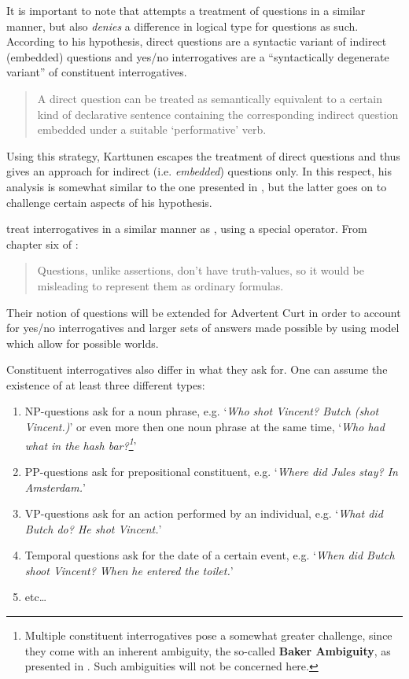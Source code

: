 \documentclass[a4paper]{article}
\newcommand{\term}[1]{\textsf{\textbf{#1}}} %
\newcommand{\pn}{\textsf} %
\newcommand{\example}[1]{`\textit{#1}'} %
\newenvironment{quotes}{\begin{quote}\sf}{\rm\end{quote}}
\newcommand{\acurt}{\pn{Advertent Curt}}
\theoremstyle{remark}
\theoremstyle{remark}
\theoremstyle{definition}
\theoremstyle{definition}
\begin{document}
It is important to note that \cite{karttunen:1977} attempts a treatment of
questions in a similar manner, but also \emph{denies} a difference in logical
type for questions as such. According to his hypothesis, direct questions are a
syntactic variant of indirect (embedded) questions and yes/no interrogatives are
a ``syntactically degenerate variant'' of constituent interrogatives.

\begin{quotes}A direct question can be treated as semantically equivalent to a
certain kind of declarative sentence containing the corresponding indirect
question embedded under  a suitable `performative' verb.\end{quotes}

Using this strategy, Karttunen escapes the treatment of direct  questions and
thus gives an approach for indirect (i.e. \emph{embedded}) questions  only.
In this respect, his analysis is somewhat similar to the one presented in
\cite{gs:sawhq}, but the latter goes on to challenge certain aspects of his
hypothesis.

\cite{blackburnbos:cl1} treat interrogatives in a similar manner as \cite{gs:q},
using a special operator. From chapter six of \cite{blackburnbos:cl1}:

\begin{quotes}
  Questions, unlike assertions, don't have truth-values, so it would be
  misleading to represent them as ordinary formulas.
\end{quotes}

Their notion of questions will be extended for \acurt{} in order to account for
yes/no interrogatives and larger sets of answers made possible by using model
which allow for possible worlds.

Constituent interrogatives also differ in what they ask for. One can assume the
existence of at least three different types:

\begin{enumerate}
  \item NP-questions ask for a noun phrase, e.g. \example{Who shot Vincent?
  Butch (shot Vincent.)} or even more then one noun phrase at the same time, \example{Who had
  what in the hash bar?\footnote{Multiple constituent interrogatives pose a
  somewhat greater challenge, since they come with an inherent ambiguity, the
  so-called \term{Baker Ambiguity}, as presented in \cite{baker:1970}.
  Such ambiguities will not be concerned here.}}
  \item PP-questions ask for prepositional constituent, e.g. \example{Where did
  Jules stay? In Amsterdam.}
  \item VP-questions ask for an action performed by an individual, e.g.
  \example{What did Butch do? He shot Vincent.}
  \item Temporal questions ask for the date of a certain event, e.g.
  \example{When did Butch shoot Vincent? When he entered the toilet.}
  \item etc\ldots
\end{enumerate}
\end{document}
